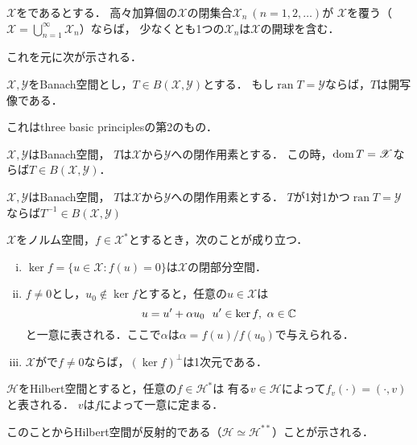 \documentclass[a4j]{jsarticle}
\newcommand{\ran}{\operatorname{ran}}
\newcommand{\spX}{\mathscr{X}}
\newcommand{\spY}{\mathscr{Y}}
\newcommand{\spB}[2]{B(\mathscr{#1}, \mathscr{#2})}
\begin{document}
    \begin{Them}[定理7.23, p.167, Baireのカテゴリー定理] \label{them7:23}
        $\spX$をであるとする．
        高々加算個の$\spX$の閉集合$\spX_n ~(n=1,2,\dots)$が
        $\spX$を覆う（$\spX=\bigcup_{n=1}^{\infty}{\spX_n}$）ならば，
        少なくとも1つの$\spX_n$は$\spX$の開球を含む．
    \end{Them}
    これを元に次が示される．

    \begin{Them}[定理7.30, p.170, 開写像原理] \label{them7:30}
        $\spX, \spY$をBanach空間とし，$T \in \spB{X}{Y}$とする．
        もし$\ran T=\spY$ならば，$T$は開写像である．
    \end{Them}
    これはthree basic principlesの第2のもの．

    \begin{Them}[定理7.33, p.172, 閉グラフ定理] \label{them7:33}
        $\spX, \spY$はBanach空間，
        $T$は$\spX$から$\spY$への閉作用素とする．
        この時，$\dom T=\spX$ならば$T \in \spB{X}{Y}$．
    \end{Them}

    \begin{Cor}[系7.34, p.172] \label{cor7:34}
        $\spX, \spY$はBanach空間，
        $T$は$\spX$から$\spY$への閉作用素とする．
        $T$が1対1かつ$\ran T=\spY$ならば$T^{-1} \in \spB{X}{Y}$
    \end{Cor}


    \begin{Them}[定理8.3, p.176] \label{them8:3}
        $\spX$をノルム空間，$f \in \spX^{\ast}$とするとき，次のことが成り立つ．
        \begin{enumerate}[i)]
            \setlength{\leftskip}{5truemm}
            \item $\ker f=\{ u \in \spX : f(u)=0 \}$は$\spX$の閉部分空間．
            \item $f\neq 0$とし，$u_0 \not \in \ker f$とすると，任意の$u \in \spX$は
                  \[ u=u'+\alpha u_0 ~~ u' \in \ker f,~ \alpha \in \mathbb{C} \]
                  と一意に表される．ここで$\alpha$は$\alpha = f(u)/f(u_0)$で与えられる．
              \item $\spX$がで$f \neq 0$ならば，$(\ker f)^{\perp}$は1次元である．
        \end{enumerate}
    \end{Them}
    \begin{Them}[定理8.5, p.177, Rieszの表現定理] \label{them8:5}
        $\mathscr{H}$をHilbert空間とすると，任意の$f \in \mathscr{H}^{\ast}$は
        有る$v \in \mathscr{H}$によって$f_v(\cdot)=(\cdot,v)$と表される．
        $v$は$f$によって一意に定まる．
    \end{Them}
    このことからHilbert空間が反射的である（$\mathscr{H} \simeq \mathscr{H}^{\ast\ast}$）ことが示される．
\end{document}
